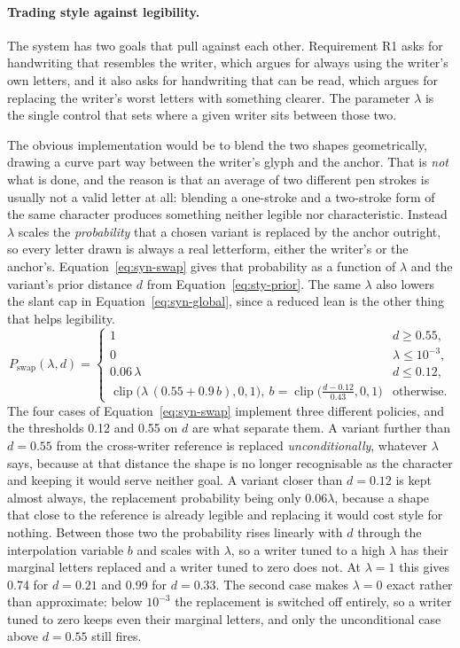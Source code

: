 \paragraph{Trading style against legibility.}
The system has two goals that pull against each other. Requirement R1 asks for handwriting that resembles the writer, which argues for always using the writer's own letters, and it also asks for handwriting that can be read, which argues for replacing the writer's worst letters with something clearer. The parameter $\lambda$ is the single control that sets where a given writer sits between those two.

The obvious implementation would be to blend the two shapes geometrically, drawing a curve part way between the writer's glyph and the anchor. That is \emph{not} what is done, and the reason is that an average of two different pen strokes is usually not a valid letter at all: blending a one-stroke and a two-stroke form of the same character produces something neither legible nor characteristic. Instead $\lambda$ scales the \emph{probability} that a chosen variant is replaced by the anchor outright, so every letter drawn is always a real letterform, either the writer's or the anchor's. Equation~\ref{eq:syn-swap} gives that probability as a function of $\lambda$ and the variant's prior distance $d$ from Equation~\ref{eq:sty-prior}. The same $\lambda$ also lowers the slant cap in Equation~\ref{eq:syn-global}, since a reduced lean is the other thing that helps legibility.
\begin{equation}
P_{\mathrm{swap}}(\lambda,d)=\begin{cases}1&d\ge0.55,\\0&\lambda\le10^{-3},\\0.06\,\lambda&d\le0.12,\\\operatorname{clip}\bigl(\lambda\,(0.55+0.9\,b),0,1\bigr),\ b=\operatorname{clip}\bigl(\tfrac{d-0.12}{0.43},0,1\bigr)&\text{otherwise.}\end{cases}
\label{eq:syn-swap}
\end{equation}
The four cases of Equation~\ref{eq:syn-swap} implement three different policies, and the thresholds 0.12 and 0.55 on $d$ are what separate them. A variant further than $d=0.55$ from the cross-writer reference is replaced \emph{unconditionally}, whatever $\lambda$ says, because at that distance the shape is no longer recognisable as the character and keeping it would serve neither goal. A variant closer than $d=0.12$ is kept almost always, the replacement probability being only $0.06\lambda$, because a shape that close to the reference is already legible and replacing it would cost style for nothing. Between those two the probability rises linearly with $d$ through the interpolation variable $b$ and scales with $\lambda$, so a writer tuned to a high $\lambda$ has their marginal letters replaced and a writer tuned to zero does not. At $\lambda=1$ this gives 0.74 for $d=0.21$ and 0.99 for $d=0.33$. The second case makes $\lambda=0$ exact rather than approximate: below $10^{-3}$ the replacement is switched off entirely, so a writer tuned to zero keeps even their marginal letters, and only the unconditional case above $d=0.55$ still fires.

